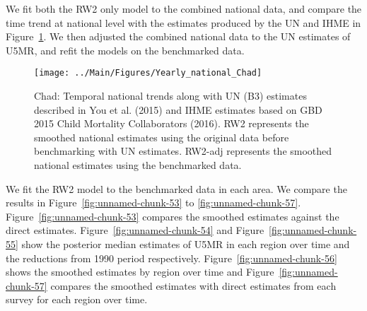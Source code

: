 \documentclass[12pt]{article}\usepackage[]{graphicx}\usepackage[]{color}
\newenvironment{knitrout}{}{} %
\begin{document}
We fit both the RW2 only model to the combined national data, and compare the time trend at national level with the estimates produced by the UN and IHME in Figure~\ref{fig:unnamed-chunk-52}. We then adjusted the combined national data to the UN estimates of U5MR, and refit the models on the benchmarked data. 

\begin{knitrout}
\color{fgcolor}\begin{figure}[bht]

{\centering \texttt{[image: ../Main/Figures/Yearly\_national\_Chad]} 

}

\caption[Chad]{Chad: Temporal national trends along with UN (B3) estimates described in You et al. (2015) and IHME estimates based on GBD 2015 Child Mortality Collaborators (2016). RW2 represents the smoothed national estimates using the original data before benchmarking with UN estimates. RW2-adj represents the smoothed national estimates using the benchmarked data.}\label{fig:unnamed-chunk-52}
\end{figure}


\end{knitrout}
 

We fit the RW2 model to the benchmarked data in each area. 
We compare the results in Figure~\ref{fig:unnamed-chunk-53} to \ref{fig:unnamed-chunk-57}.
Figure~\ref{fig:unnamed-chunk-53} compares the smoothed estimates against the direct estimates. Figure~\ref{fig:unnamed-chunk-54} and Figure~\ref{fig:unnamed-chunk-55} show the posterior median estimates of U5MR in each region over time and the reductions from 1990 period respectively.
Figure~\ref{fig:unnamed-chunk-56} shows the smoothed estimates by region over time and Figure~\ref{fig:unnamed-chunk-57} compares the smoothed estimates with direct estimates from each survey for each region over time.




\end{document}
